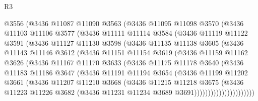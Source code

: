 \begin{lexlean}{R3}
\begin{coremodule}
          @3556
          (@3436
            @11087
            @11090
            @3563
            (@3436
              @11095
              @11098
              @3570
              (@3436
                @11103
                @11106
                @3577
                (@3436
                  @11111
                  @11114
                  @3584
                  (@3436
                    @11119
                    @11122
                    @3591
                    (@3436
                      @11127
                      @11130
                      @3598
                      (@3436
                        @11135
                        @11138
                        @3605
                        (@3436
                          @11143
                          @11146
                          @3612
                          (@3436
                            @11151
                            @11154
                            @3619
                            (@3436
                              @11159
                              @11162
                              @3626
                              (@3436
                                @11167
                                @11170
                                @3633
                                (@3436
                                  @11175
                                  @11178
                                  @3640
                                  (@3436
                                    @11183
                                    @11186
                                    @3647
                                    (@3436
                                      @11191
                                      @11194
                                      @3654
                                      (@3436
                                        @11199
                                        @11202
                                        @3661
                                        (@3436
                                          @11207
                                          @11210
                                          @3668
                                          (@3436
                                            @11215
                                            @11218
                                            @3675
                                            (@3436
                                              @11223
                                              @11226
                                              @3682
                                              (@3436 @11231 @11234 @3689 @3691))))))))))))))))))))))

\end{coremodule}
\end{lexlean}
